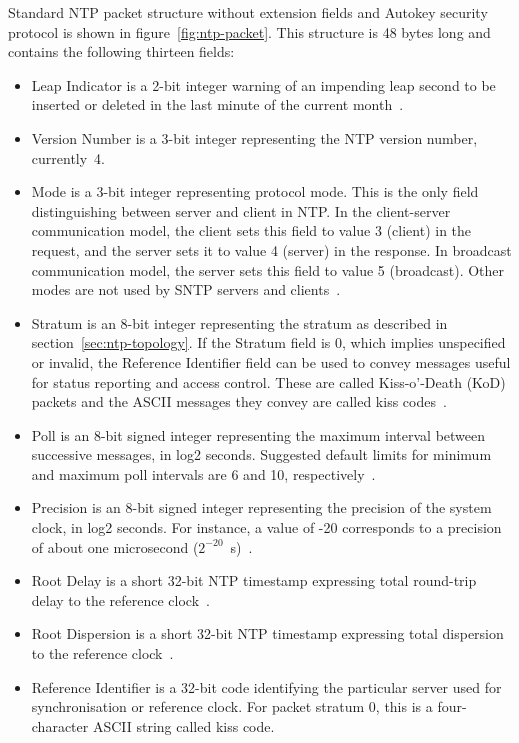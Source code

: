 Standard NTP packet structure without extension fields and
Autokey security protocol is shown in figure~\ref{fig:ntp-packet}.
This structure is 48 bytes long and contains the following thirteen fields:
\begin{itemize}
\item
Leap Indicator is a 2-bit integer warning of an impending leap
second to be inserted or deleted in the last minute of the current month~\cite{rfc5905}.
\item
Version Number is a 3-bit integer representing the NTP
version number, currently~4.
\item
Mode is a 3-bit integer representing protocol mode.
This is the only field distinguishing between server and client in NTP.
In the client-server communication model, the client sets this field to value 3 (client) in the request,
and the server sets it to value 4 (server) in the response.
In broadcast communication model, the server sets this field to value 5 (broadcast).
Other modes are not used by SNTP servers and clients~\cite{rfc5905}.
\item
Stratum is an 8-bit integer representing the stratum as described in section~\ref{sec:ntp-topology}.
If the Stratum field is 0, which implies unspecified or invalid, the
Reference Identifier field can be used to convey messages useful for
status reporting and access control.
These are called Kiss-o'-Death (KoD)
packets and the ASCII messages they convey are called kiss codes~\cite{rfc5905}.
\item
Poll is an 8-bit signed integer representing the maximum interval between
successive messages, in log2 seconds.
Suggested default limits for minimum and maximum poll intervals are 6 and 10, respectively~\cite{rfc5905}.
\item
Precision is an 8-bit signed integer representing the precision of the
system clock, in log2 seconds.
For instance, a value of -20
corresponds to a precision of about one microsecond ($2^{-20}$~s)~\cite{rfc5905}.
\item
Root Delay is a short 32-bit NTP timestamp expressing
total round-trip delay to the reference clock~\cite{rfc5905}.
\item
Root Dispersion is a short 32-bit NTP timestamp expressing
total dispersion to the reference clock~\cite{rfc5905}.
\item
Reference Identifier is a 32-bit code identifying the particular server used for synchronisation
or reference clock.
For packet stratum 0, this is a four-character ASCII string called kiss code.

\end{itemize}
